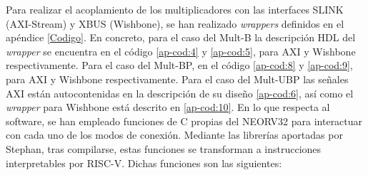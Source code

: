 Para realizar el acoplamiento de los multiplicadores con las interfaces SLINK (AXI-Stream) y XBUS (Wishbone), se han realizado \textit{wrappers} definidos en el apéndice \ref{Codigo}.
En concreto, para el caso del Mult-B la descripción HDL del \textit{wrapper} se encuentra en el código \ref{ap-cod:4} y \ref{ap-cod:5}, para AXI y Wishbone respectivamente.
Para el caso del Mult-BP, en el código \ref{ap-cod:8} y \ref{ap-cod:9}, para AXI y Wishbone respectivamente.
Para el caso del Mult-UBP las señales AXI están autocontenidas en la descripción de su diseño \ref{ap-cod:6}, así como el \textit{wrapper} para Wishbone está descrito en \ref{ap-cod:10}.
En lo que respecta al software, se han empleado funciones de C propias del NEORV32 para interactuar con cada uno de los modos de conexión.
Mediante las librerías aportadas por Stephan, tras compilarse, estas funciones se transforman a instrucciones interpretables por RISC-V.
Dichas funciones son las siguientes:
